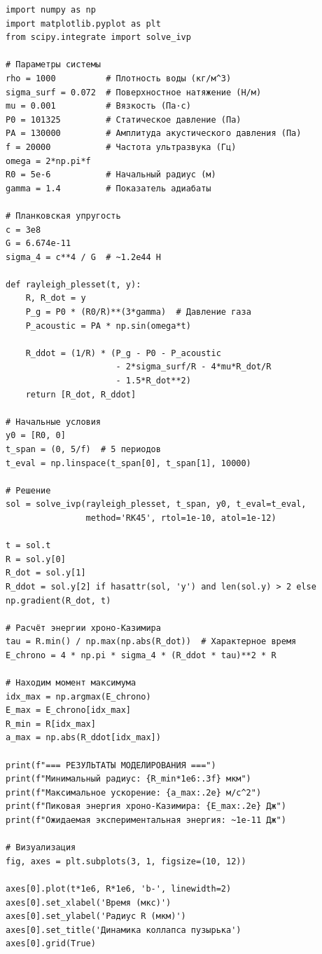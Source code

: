 \documentclass[12pt,a4paper]{article}
\begin{document}
\begin{verbatim}
import numpy as np
import matplotlib.pyplot as plt
from scipy.integrate import solve_ivp

# Параметры системы
rho = 1000          # Плотность воды (кг/м^3)
sigma_surf = 0.072  # Поверхностное натяжение (Н/м)
mu = 0.001          # Вязкость (Па·с)
P0 = 101325         # Статическое давление (Па)
PA = 130000         # Амплитуда акустического давления (Па)
f = 20000           # Частота ультразвука (Гц)
omega = 2*np.pi*f
R0 = 5e-6           # Начальный радиус (м)
gamma = 1.4         # Показатель адиабаты

# Планковская упругость
c = 3e8
G = 6.674e-11
sigma_4 = c**4 / G  # ~1.2e44 Н

def rayleigh_plesset(t, y):
    R, R_dot = y
    P_g = P0 * (R0/R)**(3*gamma)  # Давление газа
    P_acoustic = PA * np.sin(omega*t)
    
    R_ddot = (1/R) * (P_g - P0 - P_acoustic 
                      - 2*sigma_surf/R - 4*mu*R_dot/R 
                      - 1.5*R_dot**2)
    return [R_dot, R_ddot]

# Начальные условия
y0 = [R0, 0]
t_span = (0, 5/f)  # 5 периодов
t_eval = np.linspace(t_span[0], t_span[1], 10000)

# Решение
sol = solve_ivp(rayleigh_plesset, t_span, y0, t_eval=t_eval, 
                method='RK45', rtol=1e-10, atol=1e-12)

t = sol.t
R = sol.y[0]
R_dot = sol.y[1]
R_ddot = sol.y[2] if hasattr(sol, 'y') and len(sol.y) > 2 else np.gradient(R_dot, t)

# Расчёт энергии хроно-Казимира
tau = R.min() / np.max(np.abs(R_dot))  # Характерное время
E_chrono = 4 * np.pi * sigma_4 * (R_ddot * tau)**2 * R

# Находим момент максимума
idx_max = np.argmax(E_chrono)
E_max = E_chrono[idx_max]
R_min = R[idx_max]
a_max = np.abs(R_ddot[idx_max])

print(f"=== РЕЗУЛЬТАТЫ МОДЕЛИРОВАНИЯ ===")
print(f"Минимальный радиус: {R_min*1e6:.3f} мкм")
print(f"Максимальное ускорение: {a_max:.2e} м/с^2")
print(f"Пиковая энергия хроно-Казимира: {E_max:.2e} Дж")
print(f"Ожидаемая экспериментальная энергия: ~1e-11 Дж")

# Визуализация
fig, axes = plt.subplots(3, 1, figsize=(10, 12))

axes[0].plot(t*1e6, R*1e6, 'b-', linewidth=2)
axes[0].set_xlabel('Время (мкс)')
axes[0].set_ylabel('Радиус R (мкм)')
axes[0].set_title('Динамика коллапса пузырька')
axes[0].grid(True)


\end{verbatim}
\end{document}
